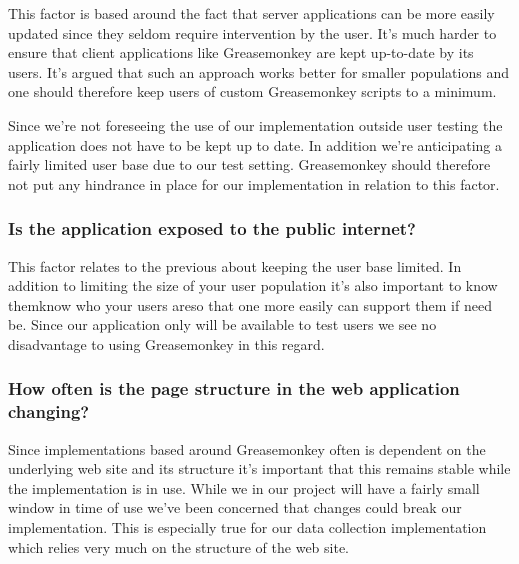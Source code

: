 This factor is based around the fact that server applications can be more
easily updated since they seldom require intervention by the user. It's
much harder to ensure that client applications like Greasemonkey are
kept up-to-date by its users. It's argued that such an approach works
better for smaller populations and one should therefore keep users
of custom Greasemonkey scripts to a minimum.

Since we're not foreseeing the use of our implementation outside user
testing the application does not have to be kept up to date. In addition
we're anticipating a fairly limited user base due to our test setting.
Greasemonkey should therefore not put any hindrance in place for
our implementation in relation to this factor.

\subsubsection{Is the application exposed to the public internet?}

This factor relates to the previous about keeping the user base limited.
In addition to limiting the size of your user population it's also
important to know them\dash{}know who your users are\dash{}so that
one more easily can support them if need be. Since our application
only will be available to test users we see no disadvantage to
using Greasemonkey in this regard.

\subsubsection{How often is the page structure in the web application
  changing?}

Since implementations based around Greasemonkey often is dependent on the
underlying web site and its structure it's important that this remains
stable while the implementation is in use. While we in our project
will have a fairly small window in time of use we've been concerned
that changes could break our implementation. This is especially true
for our data collection implementation which relies very much on the structure
of the \urort{} web site.

